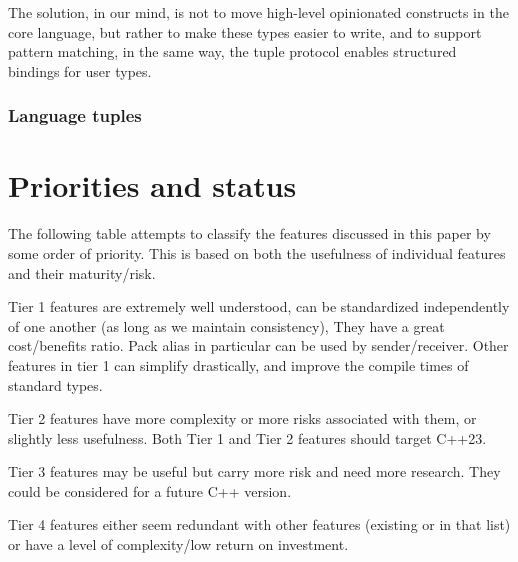 \documentclass{wg21}
\begin{document}
The solution, in our mind, is not to move high-level opinionated constructs in the core language, but rather to make these types easier to write,
and to support pattern matching, in the same way, the tuple protocol enables structured bindings for user types.

\subsubsection{Language tuples}



\section{Priorities and status}

The following table attempts to classify the features discussed in this paper by some order of priority.
This is based on both the usefulness of individual features and their maturity/risk.

Tier 1 features are extremely well understood, can be standardized independently of one another (as long as we maintain consistency),
They have a great cost/benefits ratio.
Pack alias in particular can be used by sender/receiver.
Other features in tier 1 can simplify drastically, and improve the compile times of standard types.

Tier 2 features have more complexity or more risks associated with them, or slightly less usefulness.
Both Tier 1 and Tier 2 features should target C++23.

Tier 3 features may be useful but carry more risk and need more research. They could be considered for a future C++ version.

Tier 4 features either seem redundant with other features (existing or in that list) or have a level of complexity/low return on investment.
\end{document}
